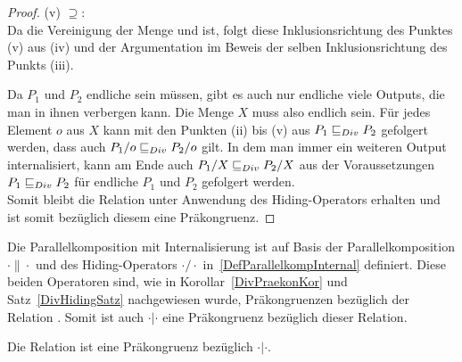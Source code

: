 \begin{proof}
  (v) \glqq $\supseteq$\grqq{}:\\
  Da \QDT{} die Vereinigung der Menge \StQT{} und \EDT{} ist, folgt diese
  Inklusionsrichtung des Punktes (v) aus (iv) und der Argumentation im Beweis
  der selben Inklusionsrichtung des Punkts (iii).

  Da $P_1$ und $P_2$ endliche sein müssen, gibt es auch nur endliche viele
  Outputs, die man in ihnen verbergen kann. Die Menge $X$ muss also endlich
  sein. Für jedes Element $o$ aus $X$ kann mit den Punkten (ii) bis (v) aus
  $P_1 \sqsubseteq  _{Div} P_2$ gefolgert werden, dass auch $P_1/o \sqsubseteq  _{Div} P_2/o$ gilt. In dem
  man immer ein weiteren Output internalisiert, kann am Ende auch $P_1/X \sqsubseteq  _{Div}
  P_2/X$ aus der Voraussetzungen $P_1 \sqsubseteq  _{Div} P_2$ für endliche \MEIO{} $P_1$ und
  $P_2$ gefolgert werden.\\
  Somit bleibt die Relation \DRel{} unter Anwendung des Hiding-Operators
  erhalten und ist somit bezüglich diesem eine Präkongruenz.
\end{proof}

Die Parallelkomposition mit Internalisierung ist auf Basis der
Parallelkomposition $\cdot \|\cdot$ und des Hiding-Operators $\cdot /\cdot$
in~\ref{DefParallelkompInternal} definiert. Diese beiden Operatoren sind, wie
in Korollar~\ref{DivPraekonKor} und Satz~\ref{DivHidingSatz} nachgewiesen
wurde, Präkongruenzen bezüglich der Relation \DRel{}. Somit ist auch $\cdot
|\cdot$ eine Präkongruenz bezüglich dieser Relation.

\begin{Kor}
  Die Relation \DRel{} ist eine Präkongruenz bezüglich $\cdot |\cdot$.
\end{Kor}
